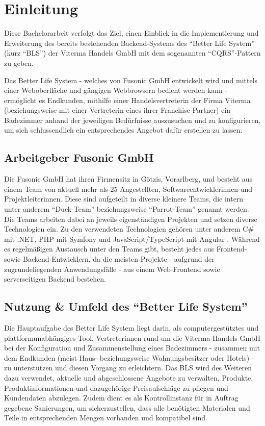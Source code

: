 \documentclass[a4paper,12pt,twoside]{scrreprt}
\begin{document}
\chapter{Einleitung}
\label{chap:einleitung}
Diese Bachelorarbeit verfolgt das Ziel, einen Einblick in die Implementierung und Erweiterung des bereits bestehenden Backend-Systems des \enquote{Better Life System} (kurz \enquote{BLS}) der Viterma Handels GmbH mit dem sogenannten \enquote{CQRS}-Pattern zu geben.

Das Better Life System - welches von Fusonic GmbH entwickelt wird und mittels einer Weboberfläche und gängigen Webbrowsern bedient werden kann - ermöglicht es Endkunden, mithilfe einer Handelsvertreterin der Firma Viterma (beziehungsweise mit einer Vertreterin eines ihrer Franchise-Partner) ein Badezimmer anhand der jeweiligen Bedürfnisse auszusuchen und zu konfigurieren, um sich schlussendlich ein entsprechendes Angebot dafür erstellen zu lassen.

\section{Arbeitgeber Fusonic GmbH}
\label{sec:arbeitgeber}
Die Fusonic GmbH hat ihren Firmensitz in Götzis, Vorarlberg, und besteht aus einem Team von aktuell mehr als 25 Angestellten, Softwareentwicklerinnen und Projektleiterinnen. Diese sind aufgeteilt in diverse kleinere Teams, die intern unter anderem \enquote{Duck-Team} beziehungsweise \enquote{Parrot-Team} genannt werden. Die Teams arbeiten dabei an jeweils eigenständigen Projekten und setzen diverse Technologien ein. Zu den verwendeten Technologien gehören unter anderem C\# mit .NET, PHP mit Symfony und JavaScript/TypeScript mit Angular \parencite[]["Übersicht aller Technologien"]{fusonic_gmbh_web_2020}. Während es regelmäßigen Austausch unter den Teams gibt, besteht jedes aus Frontend- sowie Backend-Entwicklern, da die meisten Projekte - aufgrund der zugrundeliegenden Anwendungsfälle - aus einem Web-Frontend sowie serverseitigen Backend bestehen.

\section{Nutzung \& Umfeld des \enquote{Better Life System}}
\label{sec:nutzung-umfeld}
Die Hauptaufgabe des Better Life System liegt darin, als computergestütztes und plattformunabhängiges Tool, Vertreterinnen rund um die Viterma Handels GmbH bei der Konfiguration und Zusammenstellung eines Badezimmers - zusammen mit dem Endkunden (meist Haus- beziehungsweise Wohnungsbesitzer oder Hotels) - zu unterstützen und diesen Vorgang zu erleichtern. Das BLS wird des Weiteren dazu verwendet, aktuelle und abgeschlossene Angebote zu verwalten, Produkte, Produktinformationen und dazugehörige Preisaufschläge zu pflegen und Kundendaten abzulegen. Zudem dient es als Kontrollinstanz für in Auftrag gegebene Sanierungen, um sicherzustellen, dass alle benötigten Materialen und Teile in entsprechenden Mengen vorhanden und kompatibel sind.
\end{document}
